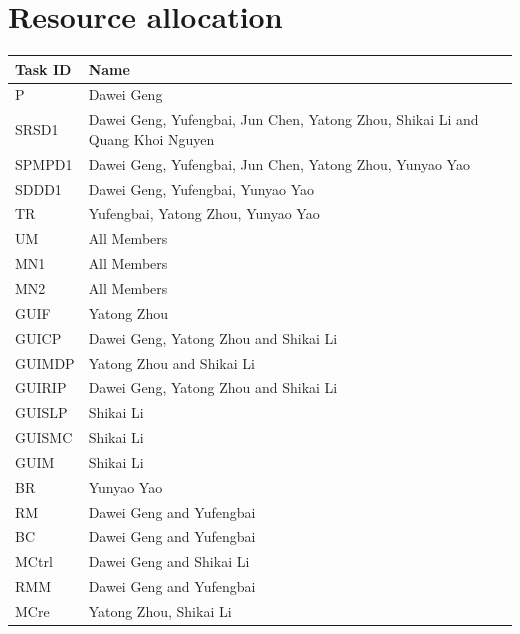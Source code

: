 \documentclass[11pt, a4paper]{report}
\begin{document}
\pagebreak
\section{Resource allocation}


\begin{center}
\begin{tabular}{| l | l |}
\hline
  Task ID 	& 			Name 																			\\ \hline
  P 		& 			Dawei Geng 																		\\ \hline
  SRSD1 	& 			Dawei Geng, Yufengbai, Jun Chen, Yatong Zhou, Shikai Li and Quang Khoi Nguyen 	\\ \hline
  SPMPD1 	& 			Dawei Geng, Yufengbai, Jun Chen, Yatong Zhou, Yunyao Yao 						\\ \hline
  SDDD1 	& 			Dawei Geng, Yufengbai, Yunyao Yao 												\\ \hline
  TR 		&  			Yufengbai, Yatong Zhou, Yunyao Yao 												\\ \hline
  UM  		& 			All Members  																	\\ \hline
  MN1 		& 			All Members 																	\\ \hline
  MN2 		& 			All Members 																	\\ \hline
  GUIF 		&  			Yatong Zhou                                                                     \\ \hline
  GUICP 	& 			Dawei Geng, Yatong Zhou and Shikai Li 											\\ \hline
  GUIMDP 	& 			Yatong Zhou and Shikai Li  														\\ \hline
  GUIRIP 	& 			Dawei Geng, Yatong Zhou and Shikai Li 											\\ \hline
  GUISLP 	& 			Shikai Li 																		\\ \hline
  GUISMC 	& 			Shikai Li 																		\\ \hline
  GUIM 		&  			Shikai Li 																		\\ \hline
  BR 		& 			Yunyao Yao 																		\\ \hline
  RM 		& 			Dawei Geng and Yufengbai 														\\ \hline
  BC 		& 			Dawei Geng and Yufengbai 														\\ \hline
  MCtrl 	& 			Dawei Geng and Shikai Li 														\\ \hline
  RMM 		& 			Dawei Geng and Yufengbai														\\ \hline
  MCre 		&  			Yatong Zhou, Shikai Li 															\\ \hline

\end{tabular}
\end{center}
\end{document}
